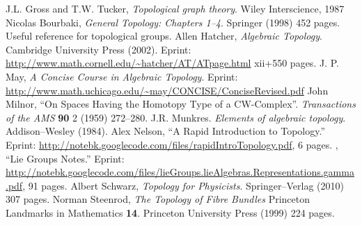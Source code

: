 
\begin{thebibliography}{99}
J.L. Gross and T.W. Tucker, \newblock
\emph{Topological graph theory}. \newblock
Wiley Interscience, 1987
 Nicolas Bourbaki,
\newblock \emph{General Topology: Chapters 1--4}.
\newblock Springer (1998) 452 pages.
\newblock Useful reference for topological groups.
 Allen Hatcher,
\newblock\emph{Algebraic Topology}.
\newblock Cambridge University Press (2002).
\newblock Eprint: \url{http://www.math.cornell.edu/~hatcher/AT/ATpage.html}
xii+550 pages.
 J. P. May, \newblock
\emph{A Concise Course in Algebraic Topology}.\newblock
Eprint: \url{http://www.math.uchicago.edu/~may/CONCISE/ConciseRevised.pdf}
 John Milnor,\newblock
``On Spaces Having the Homotopy Type of a CW-Complex''.\newblock
\emph{Transactions of the AMS} {\bf 90} 2 (1959) 272--280.
 J.R. Munkres. \newblock
\emph{Elements of algebraic topology}.\newblock
Addison--Wesley (1984).
 Alex Nelson, \newblock
``A Rapid Introduction to Topology.''\newblock
Eprint: \url{http://notebk.googlecode.com/files/rapidIntroTopology.pdf},
6 pages.
 \bysame, \newblock
``Lie Groups Notes.''\newblock
Eprint: \url{http://notebk.googlecode.com/files/lieGroups.lieAlgebras.Representations.gamma.pdf},
91 pages.
 Albert Schwarz,
\newblock\emph{Topology for Physicists}.
\newblock Springer--Verlag (2010) 307 pages. 
 Norman Steenrod,
\newblock \emph{The Topology of Fibre Bundles}
\newblock Princeton Landmarks in Mathematics \textbf{14}.
\newblock Princeton University Press (1999) 224 pages.
\end{thebibliography}
